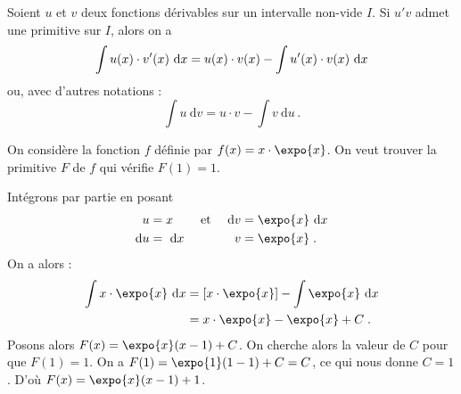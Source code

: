 	      \begin{thm}
	            Soient $u$ et $v$ deux fonctions d\'erivables sur un intervalle non-vide $I$.
	            Si $u'v$ admet une primitive sur $I$, alors on a 
	                  \begin{equation*}
	                        \int u(x) \cdot v'(x) ~\mathrm{d}x = u(x) \cdot v(x) - \int u'(x) \cdot v(x) ~\mathrm{d}x      
	                  \label{eq:IPP fonctions}
	                  \end{equation*}
	            ou, avec d'autres notations :
	                  \begin{equation*}
	                        \int u \ \mathrm{d}v = u \cdot v - \int v \ \mathrm{d}u      \,.
	                  \label{eq:IPP differentielles}
	                  \end{equation*}
	            \begin{ex}
	                  On consid\`ere la fonction $f$ d\'efinie par $f(x) = x\cdot \expo{x}$.
	                  On veut trouver la primitive $F$ de $f$ qui v\'erifie $F(1) = 1$.
	                  
	                  Int\'egrons par partie en posant
	                        \begin{align*}
	                              u           & = x       & \text{ et } & &      \mathrm{d}v & = \expo{x} \dx      \\
	                              \mathrm{d}u & = \dx     & \text{    } & &      v           & = \expo{x}          \;.
	                        \end{align*}
	                  On a alors :
	                        \begin{align*}
	                        \int x \cdot \expo{x} \dx & = [x \cdot \expo{x} ] - \int \expo{x} \dx       \\
	                                                  & = x \cdot \expo{x} - \expo{x} + C               \;.
	                        \end{align*}
	                  Posons alors $F(x) = \expo{x} (x-1) + C$.
	                  On cherche alors la valeur de $C$ pour que $F(1) = 1$.
	                  On a $
	                              F(1) = \expo{1} (1-1) + C = C
	                       $,
	                       ce qui nous donne $C = 1$.
	                  D'o\`u $F(x) = \expo{x} (x-1) + 1$.
	            \end{ex}
	      \end{thm}
